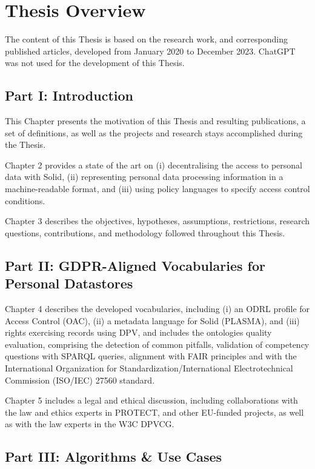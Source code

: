 \section{Thesis Overview}
\label{sec:thesis_overview}

The content of this Thesis is based on the research work, and corresponding published articles, developed from January 2020 to December 2023.
ChatGPT was not used for the development of this Thesis.

\subsection*{Part I: Introduction}

This Chapter presents the motivation of this Thesis and resulting publications, a set of definitions, as well as the projects and research stays accomplished during the Thesis.

Chapter 2 provides a state of the art on (i) decentralising the access to personal data with Solid, (ii) representing personal data processing information in a machine-readable format, and (iii) using policy languages to specify access control conditions.

Chapter 3 describes the objectives, hypotheses, assumptions, restrictions, research questions, contributions, and methodology followed throughout this Thesis.

\subsection*{Part II: GDPR-Aligned Vocabularies for Personal Datastores}

Chapter 4 describes the developed vocabularies, including (i) an ODRL profile for Access Control (OAC), (ii) a metadata language for Solid (PLASMA), and (iii) rights exercising records using DPV, and includes the ontologies quality evaluation, comprising the detection of common pitfalls, validation of competency questions with SPARQL queries, alignment with FAIR principles and with the International Organization for Standardization/International Electrotechnical Commission (ISO/IEC) 27560 standard.

Chapter 5 includes a legal and ethical discussion, including collaborations with the law and ethics experts in PROTECT, and other EU-funded projects, as well as with the law experts in the W3C DPVCG.

\subsection*{Part III: Algorithms \& Use Cases}

